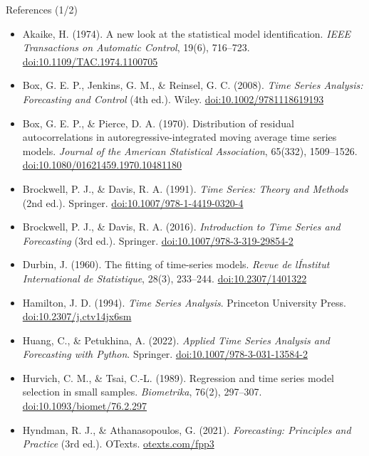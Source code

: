 \begin{frame}{References (1/2)}
\itemsize{\scriptsize}
\begin{itemize}
    \item Akaike, H. (1974). A new look at the statistical model identification. \textit{IEEE Transactions on Automatic Control}, 19(6), 716--723. \href{https://doi.org/10.1109/TAC.1974.1100705}{doi:10.1109/TAC.1974.1100705}
    \item Box, G. E. P., Jenkins, G. M., \& Reinsel, G. C. (2008). \textit{Time Series Analysis: Forecasting and Control} (4th ed.). Wiley. \href{https://doi.org/10.1002/9781118619193}{doi:10.1002/9781118619193}
    \item Box, G. E. P., \& Pierce, D. A. (1970). Distribution of residual autocorrelations in autoregressive-integrated moving average time series models. \textit{Journal of the American Statistical Association}, 65(332), 1509--1526. \href{https://doi.org/10.1080/01621459.1970.10481180}{doi:10.1080/01621459.1970.10481180}
    \item Brockwell, P. J., \& Davis, R. A. (1991). \textit{Time Series: Theory and Methods} (2nd ed.). Springer. \href{https://doi.org/10.1007/978-1-4419-0320-4}{doi:10.1007/978-1-4419-0320-4}
    \item Brockwell, P. J., \& Davis, R. A. (2016). \textit{Introduction to Time Series and Forecasting} (3rd ed.). Springer. \href{https://doi.org/10.1007/978-3-319-29854-2}{doi:10.1007/978-3-319-29854-2}
    \item Durbin, J. (1960). The fitting of time-series models. \textit{Revue de l\'Institut International de Statistique}, 28(3), 233--244. \href{https://doi.org/10.2307/1401322}{doi:10.2307/1401322}
    \item Hamilton, J. D. (1994). \textit{Time Series Analysis}. Princeton University Press. \href{https://doi.org/10.2307/j.ctv14jx6sm}{doi:10.2307/j.ctv14jx6sm}
    \item Huang, C., \& Petukhina, A. (2022). \textit{Applied Time Series Analysis and Forecasting with Python}. Springer. \href{https://doi.org/10.1007/978-3-031-13584-2}{doi:10.1007/978-3-031-13584-2}
    \item Hurvich, C. M., \& Tsai, C.-L. (1989). Regression and time series model selection in small samples. \textit{Biometrika}, 76(2), 297--307. \href{https://doi.org/10.1093/biomet/76.2.297}{doi:10.1093/biomet/76.2.297}
    \item Hyndman, R. J., \& Athanasopoulos, G. (2021). \textit{Forecasting: Principles and Practice} (3rd ed.). OTexts. \href{https://otexts.com/fpp3/}{otexts.com/fpp3}
\end{itemize}
\end{frame}

